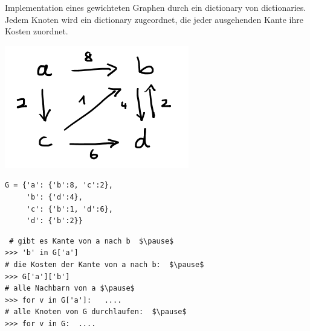 \begin{frame}[fragile]
Implementation eines gewichteten Graphen durch ein dictionary von dictionaries. Jedem Knoten wird ein dictionary zugeordnet, die jeder ausgehenden Kante ihre Kosten zuordnet.
 
\begin{minipage}{5cm}
\includegraphics[scale=0.6]{bild31.png} 
\end{minipage} \pause
\begin{minipage}{5cm}
\begin{lstlisting} 
G = {'a': {'b':8, 'c':2},          
     'b': {'d':4},               
     'c': {'b':1, 'd':6},          
     'd': {'b':2}}
\end{lstlisting}
\end{minipage} \pause

\begin{lstlisting} 
 # gibt es Kante von a nach b  $\pause$
>>> 'b' in G['a']  
# die Kosten der Kante von a nach b:  $\pause$
>>> G['a']['b']     
# alle Nachbarn von a $\pause$
>>> for v in G['a']:   ....
# alle Knoten von G durchlaufen:  $\pause$
>>> for v in G:  ....

\end{lstlisting}
\end{frame}

